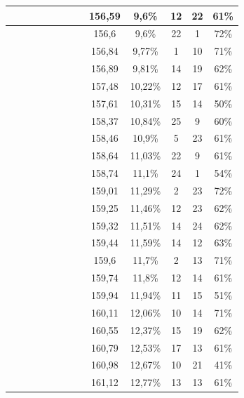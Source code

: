 \begin{center}
\begin{longtable}{|c|c|c|c|c|c|c|c|c|c|c|c|c|}
 \x &  &  &  \x &  \x &  &  \x &  \x & 156,59 & 9,6\% & 12 & 22 & 61\% \\ \hline
 \x &  &  &  &  &  \x &  \x &  \x & 156,6 & 9,6\% & 22 & 1 & 72\% \\ \hline
 \x &  &  \x &  &  \x &  \x &  \x &  \x & 156,84 & 9,77\% & 1 & 10 & 71\% \\ \hline
 \x &  &  \x &  &  &  &  \x &  \x & 156,89 & 9,81\% & 14 & 19 & 62\% \\ \hline
 \x &  \x &  &  \x &  \x &  &  \x &  \x & 157,48 & 10,22\% & 12 & 17 & 61\% \\ \hline
 \x &  &  &  \x &  &  &  \x &  \x & 157,61 & 10,31\% & 15 & 14 & 50\% \\ \hline
 \x &  &  &  \x &  \x &  &  &  \x & 158,37 & 10,84\% & 25 & 9 & 60\% \\ \hline
 \x &  \x &  &  &  \x &  &  \x &  \x & 158,46 & 10,9\% & 5 & 23 & 61\% \\ \hline
 \x &  \x &  &  \x &  \x &  &  &  \x & 158,64 & 11,03\% & 22 & 9 & 61\% \\ \hline
 \x &  \x &  &  &  &  &  \x &  \x & 158,74 & 11,1\% & 24 & 1 & 54\% \\ \hline
 \x &  \x &  &  &  \x &  \x &  \x &  \x & 159,01 & 11,29\% & 2 & 23 & 72\% \\ \hline
 \x &  &  \x &  &  \x &  &  \x &  \x & 159,25 & 11,46\% & 12 & 23 & 62\% \\ \hline
 \x &  \x &  \x &  \x &  \x &  &  \x &  \x & 159,32 & 11,51\% & 14 & 24 & 62\% \\ \hline
 \x &  \x &  \x &  &  \x &  &  \x &  \x & 159,44 & 11,59\% & 14 & 12 & 63\% \\ \hline
 \x &  &  \x &  &  &  \x &  \x &  \x & 159,6 & 11,7\% & 2 & 13 & 71\% \\ \hline
 \x &  \x &  \x &  &  \x &  &  &  \x & 159,74 & 11,8\% & 12 & 14 & 61\% \\ \hline
 \x &  &  &  \x &  &  &  \x &  \x & 159,94 & 11,94\% & 11 & 15 & 51\% \\ \hline
 \x &  \x &  &  \x &  &  \x &  \x &  \x & 160,11 & 12,06\% & 10 & 14 & 71\% \\ \hline
 \x &  \x &  \x &  \x &  \x &  &  &  \x & 160,55 & 12,37\% & 15 & 19 & 62\% \\ \hline
 \x &  &  &  &  \x &  &  \x &  \x & 160,79 & 12,53\% & 17 & 13 & 61\% \\ \hline
 \x &  &  &  &  &  &  \x &  \x & 160,98 & 12,67\% & 10 & 21 & 41\% \\ \hline
 \x &  \x &  &  \x &  \x &  &  \x &  \x & 161,12 & 12,77\% & 13 & 13 & 61\% \\ \hline

\end{longtable}
\end{center}
